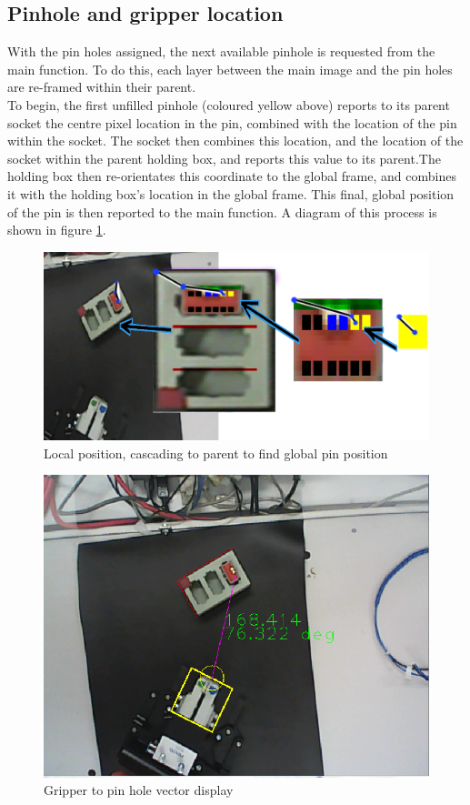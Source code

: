 \documentclass[11pt,a4paper, margin=1in]{report}
\begin{document}
\subsection{Pinhole and gripper location}
With the pin holes assigned, the next available pinhole is requested from the main function. To do this, each layer between the main image and the pin holes are re-framed within their parent.\\
To begin, the first unfilled pinhole (coloured yellow above) reports to its parent socket the centre pixel location in the pin, combined with the location of the pin within the socket. The socket then combines this location, and the location of the socket within the parent holding box, and reports this value to its parent.The holding box then re-orientates this coordinate to the global frame, and combines it with the holding box's location in the global frame. This final, global position of the pin is then reported to the main function.
A diagram of this process is shown in figure \cref{fig:aaah}.
\begin{figure}[h]
\centering
\includegraphics[width=\linewidth]{aaah}
\caption{Local position, cascading to parent to find global pin position}
\label{fig:aaah}
\end{figure}

\begin{figure}[h]
\centering
\includegraphics[width=0.5\linewidth]{vector}
\caption{Gripper to pin hole vector display}
\label{fig:vector}
\end{figure}
 \FloatBarrier
 
\end{document}
